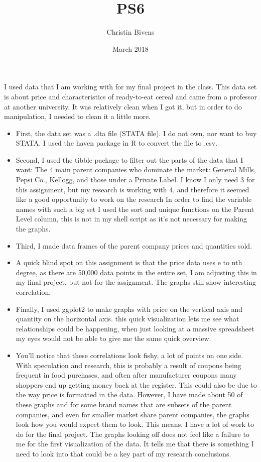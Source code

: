 \documentclass{article}
\title{PS6}
\author{Christin Bivens}
\date{March 2018}
\begin{document}
\maketitle


I used data that I am working with for my final project in the class. This data set is about price and characteristics of ready-to-eat cereal and came from a professor at another university. It was relatively clean when I got it, but in order to do manipulation, I needed to clean it a little more.

\begin{itemize}
    \item First, the data set was a .dta file (STATA file). I do not own, nor want to buy STATA. I used the haven package in R to convert the file to .csv. 
    \item Second, I used the tibble package to filter out the parts of the data that I want: The 4 main parent companies who dominate the market: General Mills, Pepsi Co., Kellogg, and those under a Private Label. I know I only need 3 for this assignment, but my research is working with 4, and therefore it seemed like a good opportunity to work on the research
    In order to find the variable names with such a big set I used the sort and unique functions on the Parent Level column, this is not in my shell script as it's not necessary for making the graphs.
    \item Third, I made data frames of the parent company prices and quantities sold.
    \item A quick blind spot on this assignment is that the price data uses e to nth degree, as there are 50,000 data points in the entire set, I am adjusting this in my final project, but not for the assignment. The graphs still show interesting correlation.
    \item Finally, I used ggplot2 to make graphs with price on the vertical axis and quantity on the horizontal axis. this quick visualization lets me see what relationships could be happening, when just looking at a massive spreadsheet my eyes would not be able to give me the same quick overview.
    \item You'll notice that these correlations look fishy, a lot of points on one side. With speculation and research, this is probably a result of coupons being frequent in food purchases, and often after manufacturer coupons many shoppers end up getting money back at the register. This could also be due to the way price is formatted in the data. However, I have made about 50 of these graphs and for some brand names that are subsets of the parent companies, and even for smaller market share parent companies, the graphs look how you would expect them to look. This means, I have a lot of work to do for the final project.
        The graphs looking off does not feel like a failure to me for the first visualization of the data. It tells me that there is something I need to look into that could be a key part of my research conclusions.
\end{itemize}
\end{document}
